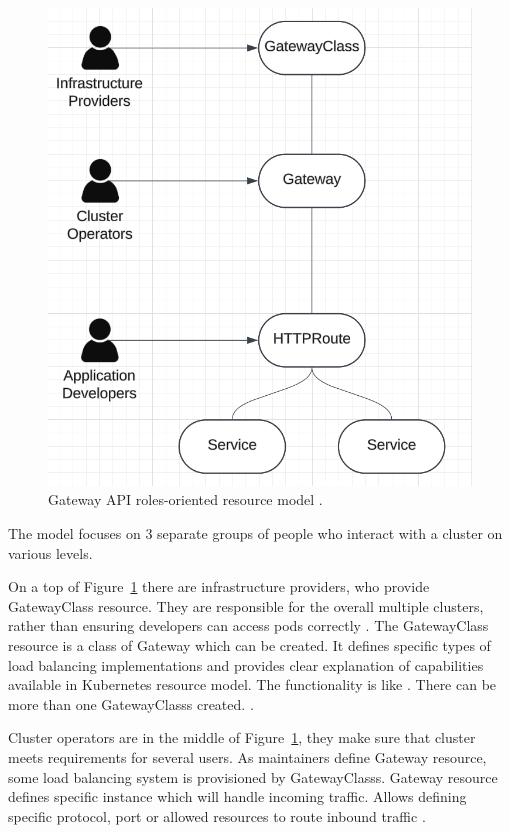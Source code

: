 \begin{figure}[tbh]
    \centering
    \includegraphics[width=0.7\columnwidth]{images/gateway-api-resource-model.png}
    \caption{Gateway API roles-oriented resource model \cite{LucidApp}\cite{KubernetesGatewayAPI}\cite{PersonIcon}.}
    \label{fig:gatewayApiResourceModel}
\end{figure}

The model focuses on 3 separate groups of people who interact with a cluster on various levels. 

On a top of Figure~\ref{fig:gatewayApiResourceModel} there are infrastructure providers, who provide GatewayClass resource. They are responsible for the overall multiple clusters, rather than ensuring developers can access pods correctly \cite{KubernetesGatewayAPI}. The GatewayClass resource is a class of Gateway which can be created. It defines specific types of load balancing implementations and provides clear explanation of capabilities available in Kubernetes resource model. The functionality is like \textit{} \cite{KubernetesGatewayAPI} \cite{KubernetesGatewayClass}. There can be more than one GatewayClasss created. \cite{KubernetesGatewayAPI}. 


Cluster operators are in the middle of Figure~\ref{fig:gatewayApiResourceModel}, they make sure that cluster meets requirements for several users. As maintainers define Gateway resource, some load balancing system is provisioned by GatewayClasss. Gateway resource defines specific instance which will handle incoming traffic. Allows defining specific protocol, port or allowed resources to route inbound traffic \cite{KubernetesGatewayAPI} \cite{KubernetesGateway}.

